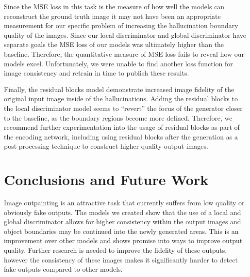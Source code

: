 \documentclass{article}
\begin{document}
Since the MSE loss in this task is the measure of how well the models can reconstruct the ground truth image it may not have been an appropriate measurement for our specific problem of increasing the hallucination boundary quality of the images. Since our local discriminator and global discriminator have separate goals the MSE loss of our models was ultimately higher than the baseline. Therefore, the quantitative measure of MSE loss fails to reveal how our models excel. Unfortunately, we were unable to find another loss function for image consistency and retrain in time to publish these results.
	
Finally, the residual blocks model demonstrate increased image fidelity of the original input image inside of the hallucinations. Adding the residual blocks to the local discriminator model seems to ``revert'' the focus of the generator closer to the baseline, as the boundary regions become more defined. Therefore, we recommend further experimentation into the usage of residual blocks as part of the encoding network, including using residual blocks after the generation as a post-processing technique to construct higher quality output images.

\section{Conclusions and Future Work}
Image outpainting is an attractive task that currently suffers from low quality or obviously fake outputs. The models we created show that the use of a local and global discriminator allows for higher consistency within the output images and object boundaries may be continued into the newly generated areas. This is an improvement over other models and shows promise into ways to improve output quality. Further research is needed to improve the fidelity of these outputs, however the consistency of these images makes it significantly harder to detect fake outputs compared to other models.
\end{document}
